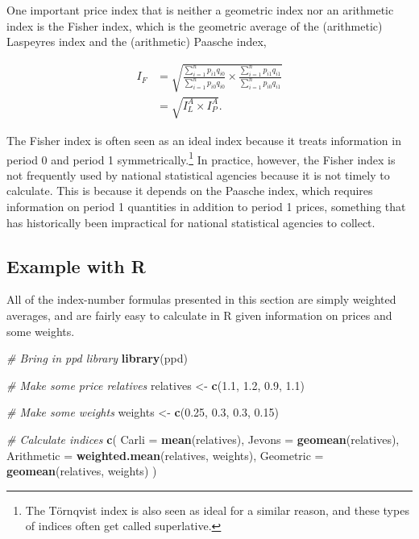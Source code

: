 \documentclass[]{article}
\newenvironment{Shaded}{\begin{snugshade}}{\end{snugshade}}
\newcommand{\CommentTok}[1]{\textcolor[rgb]{0.56,0.35,0.01}{\textit{#1}}}
\newcommand{\DataTypeTok}[1]{\textcolor[rgb]{0.13,0.29,0.53}{#1}}
\newcommand{\FloatTok}[1]{\textcolor[rgb]{0.00,0.00,0.81}{#1}}
\newcommand{\KeywordTok}[1]{\textcolor[rgb]{0.13,0.29,0.53}{\textbf{#1}}}
\newcommand{\NormalTok}[1]{#1}
\newcommand{\StringTok}[1]{\textcolor[rgb]{0.31,0.60,0.02}{#1}}
\begin{document}
One important price index that is neither a geometric index nor an arithmetic index is the Fisher index, which is the geometric average of the (arithmetic) Laspeyres index and the (arithmetic) Paasche index,

\begin{align*}
I_{F} &= \sqrt{\frac{\sum_{i = 1}^{n} p_{i1} q_{i0}}{\sum_{i = 1}^{n} p_{i0} q_{i0}} \times \frac{\sum_{i = 1}^{n} p_{i1} q_{i1}}{\sum_{i = 1}^{n} p_{i0} q_{i1}}} \\
&= \sqrt{I^{A}_{L} \times I^{A}_{P}}.
\end{align*}

The Fisher index is often seen as an ideal index because it treats information in period 0 and period 1 symmetrically.\footnote{The Törnqvist index is also seen as ideal for a similar reason, and these types of indices often get called superlative.} In practice, however, the Fisher index is not frequently used by national statistical agencies because it is not timely to calculate. This is because it depends on the Paasche index, which requires information on period 1 quantities in addition to period 1 prices, something that has historically been impractical for national statistical agencies to collect.

\hypertarget{example-with-r}{%
\subsection{Example with R}\label{example-with-r}}

All of the index-number formulas presented in this section are simply weighted averages, and are fairly easy to calculate in R given information on prices and some weights.

\begin{Shaded}
\begin{Highlighting}[]
\CommentTok{# Bring in ppd library}
\KeywordTok{library}\NormalTok{(ppd)}

\CommentTok{# Make some price relatives}
\NormalTok{relatives <-}\StringTok{ }\KeywordTok{c}\NormalTok{(}\FloatTok{1.1}\NormalTok{, }\FloatTok{1.2}\NormalTok{, }\FloatTok{0.9}\NormalTok{, }\FloatTok{1.1}\NormalTok{)}

\CommentTok{# Make some weights}
\NormalTok{weights <-}\StringTok{ }\KeywordTok{c}\NormalTok{(}\FloatTok{0.25}\NormalTok{, }\FloatTok{0.3}\NormalTok{, }\FloatTok{0.3}\NormalTok{, }\FloatTok{0.15}\NormalTok{)}

\CommentTok{# Calculate indices}
\KeywordTok{c}\NormalTok{(}
  \DataTypeTok{Carli =} \KeywordTok{mean}\NormalTok{(relatives), }
  \DataTypeTok{Jevons =} \KeywordTok{geomean}\NormalTok{(relatives), }
  \DataTypeTok{Arithmetic =} \KeywordTok{weighted.mean}\NormalTok{(relatives, weights),}
  \DataTypeTok{Geometric =} \KeywordTok{geomean}\NormalTok{(relatives, weights)}
\NormalTok{)}
\end{Highlighting}
\end{Shaded}
\end{document}
